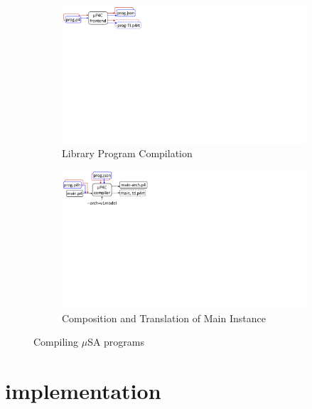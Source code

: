\documentclass[10pt,sigconf,letterpaper,anonymous]{acmart}
\begin{document}
\begin{figure}[!h]
    \begin{subfigure}{\linewidth}
        \centering
        \includegraphics[trim=0 450 645 0, clip,scale=0.55]{mp4c-frontend}
        \caption{Library Program Compilation}
        \label{subfig:compiling-modules}
    \end{subfigure}
    \begin{subfigure}{\linewidth}
        \centering
        \includegraphics[trim=0 405 623 0, clip,scale=0.55]{mp4c-compiler}
        \caption{Composition and Translation of Main Instance}
        \label{subfig:composition-translation-of-main-instance}
    \end{subfigure}
\caption{Compiling $\mu$SA programs}
\label{fig:compiling-msa-programs}
\end{figure}






\section{implementation}
\end{document}
